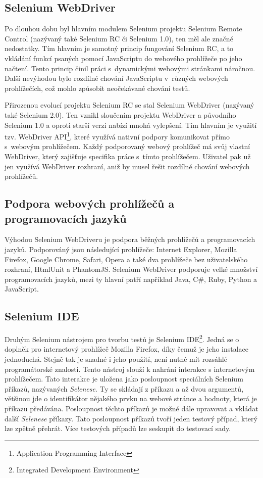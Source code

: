 \documentclass[
    color,   %
	table,   %
    twoside, %
]{fithesis3}
\begin{document}
\subsection{Selenium WebDriver}
Po dlouhou dobu byl hlavním modulem Selenium projektu Selenium Remote Control (nazývaný také Selenium RC či Selenium 1.0), ten měl ale značné nedostatky. Tím hlavním je samotný princip fungování Selenium RC, a to vkládání funkcí psaných pomocí JavaScriptu do webového prohlížeče po jeho načtení. Tento princip činil práci s~dynamickými webovými stránkami náročnou. Další nevýhodou bylo rozdílné chování JavaScriptu v~různých webových prohlížečích, což mohlo způsobit neočekávané chování testů.

Přirozenou evolucí projektu Selenium RC se stal Selenium WebDriver (nazývaný také Selenium 2.0). Ten vznikl sloučením projektu WebDriver a původního Selenium 1.0 a oproti starší verzi nabízí mnohá vylepšení. Tím hlavním je využití tzv. WebDriver API\footnote{Application Programming Interface}, které využívá nativní podpory komunikovat přímo s~webovým prohlížečem. Každý podporovaný webový prohlížeč má svůj vlastní WebDriver, který zajišťuje specifika práce s~tímto prohlížečem. Uživatel pak už jen využívá WebDriver rozhraní, aniž by musel řešit rozdílné chování webových prohlížečů. 

\subsection*{Podpora webových prohlížečů a programovacích jazyků}
Výhodou Selenium WebDriveru je podpora běžných prohlížečů a programovacích jazyků. Podporováný jsou následující prohlížeče: Internet Explorer, Mozilla Firefox, Google Chrome, Safari, Opera a také dva prohlížeče bez uživatelského rozhraní, HtmlUnit a PhantomJS. Selenium WebDriver podporuje velké množství programovacích jazyků, mezi ty hlavní patří například Java, C\#, Ruby, Python a JavaScript.

\subsection{Selenium IDE}

Druhým Selenium nástrojem pro tvorbu testů je Selenium IDE\footnote{Integrated Development Environment}. Jedná se o doplněk pro internetový prohlížeč Mozilla Firefox, díky čemuž je jeho instalace jednoduchá. Stejně tak je snadné i jeho použití, není nutné mít rozsáhlé programátorské znalosti. Tento nástroj slouží k nahrání interakce s internetovým prohlížečem. Tato interakce je uložena jako posloupnost speciálních Selenium příkazů, nazývaných \emph{Selenese}. Ty se skládají z příkazu a až dvou argumentů, většinou jde o identifikátor nějakého prvku na webové stránce a hodnoty, která je příkazu předávána. Posloupnost těchto příkazů je možné dále upravovat a vkládat další \emph{Selenese} příkazy. Tato posloupnost příkazů tvoří jeden testový případ, který lze zpětně přehrát. Více testových případů lze seskupit do testovací sady. \cite{Selenium}
\end{document}
